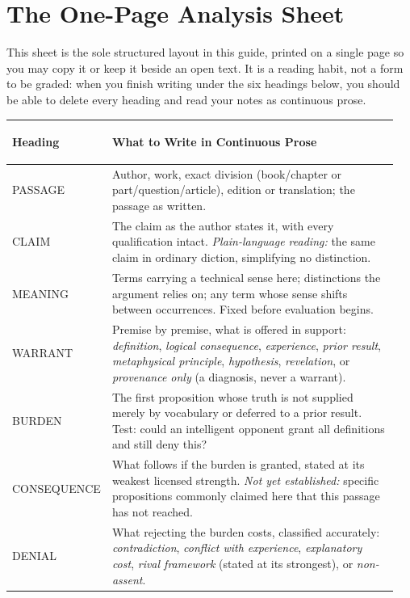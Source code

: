 \section{The One-Page Analysis Sheet}

This sheet is the sole structured layout in this guide, printed on a single page so you may copy it or keep it beside an open text. It is a reading habit, not a form to be graded: when you finish writing under the six headings below, you should be able to delete every heading and read your notes as continuous prose.

\begin{tabular}{>{\bfseries\raggedright\arraybackslash}p{0.20\linewidth}>{\raggedright\arraybackslash}p{0.75\linewidth}}
\toprule
Heading & What to Write in Continuous Prose \\
\midrule
PASSAGE & Author, work, exact division (book/chapter or part/question/article), edition or translation; the passage as written. \\
CLAIM & The claim as the author states it, with every qualification intact. \emph{Plain-language reading:} the same claim in ordinary diction, simplifying no distinction. \\
MEANING & Terms carrying a technical sense here; distinctions the argument relies on; any term whose sense shifts between occurrences. Fixed before evaluation begins. \\
WARRANT & Premise by premise, what is offered in support: \emph{definition}, \emph{logical consequence}, \emph{experience}, \emph{prior result}, \emph{metaphysical principle}, \emph{hypothesis}, \emph{revelation}, or \emph{provenance only} (a diagnosis, never a warrant). \\
BURDEN & The first proposition whose truth is not supplied merely by vocabulary or deferred to a prior result. Test: could an intelligent opponent grant all definitions and still deny this? \\
CONSEQUENCE & What follows if the burden is granted, stated at its weakest licensed strength. \emph{Not yet established:} specific propositions commonly claimed here that this passage has not reached. \\
DENIAL & What rejecting the burden costs, classified accurately: \emph{contradiction}, \emph{conflict with experience}, \emph{explanatory cost}, \emph{rival framework} (stated at its strongest), or \emph{non-assent}. \\
\bottomrule
\end{tabular}

